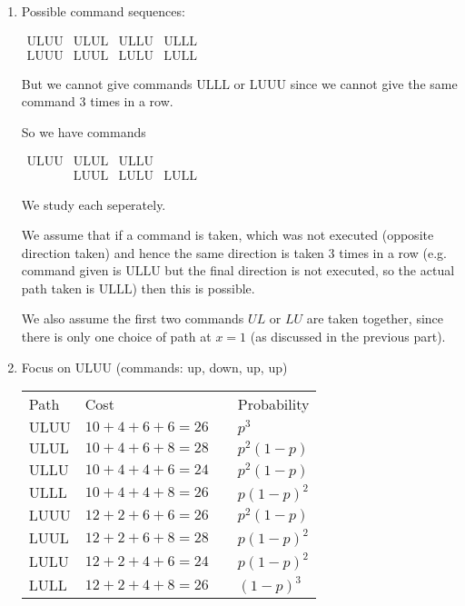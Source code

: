 \begin{prob}
\begin{enumerate}[label = {\textbf{(\greek*)}}]
    \begin{sol}
    \begin{enumerate}[start = 1, label = {\protect\tsc{$\mathbf{S_{\arabic*}}$}}]
\item Possible command sequences:

$\begin{array}{cccc}
    \text{ULUU} & \text{ULUL} & \text{ULLU} & \text{ULLL}  \\
    \text{LUUU} & \text{LUUL} & \text{LULU} & \text{LULL}  
\end{array}$

But we cannot give commands $\text{ULLL}$ or $\text{LUUU}$ since we cannot give the same command 3 times in a row.

So we have commands 

$\begin{array}{cccc}
    \text{ULUU} & \text{ULUL} & \text{ULLU} &   \\
         & \text{LUUL} & \text{LULU} & \text{LULL}  
\end{array}$

We study each seperately.

We assume that if a command is taken, which was not executed (opposite direction taken) and hence the same direction is taken 3 times in a row (e.g. command given is $\text{ULLU}$ but the final direction is not executed, so the actual path taken is $\text{ULLL}$) then this is possible.

We also assume the first two commands $UL$ or $LU$ are taken together, since there is only one choice of path at $x=1$ (as discussed in the previous part).

\item Focus on $\text{ULUU}$ (commands: up, down, up, up)

\begin{tabular}{llcl}
    Path & Cost & \quad & Probability  \\
    $\text{ULUU}$ & $10+4+6+6=26$ & & $p^3$ \\
    $\text{ULUL}$ & $10+4+6+8=28$ & & $p^2(1-p)$ \\
    $\text{ULLU}$ & $10+4+4+6=24$ & & $p^2(1-p)$ \\
    $\text{ULLL}$ & $10+4+4+8=26$ & & $p(1-p)^2$ \\
    $\text{LUUU}$ & $12+2+6+6=26$ & & $p^2(1-p)$ \\
    $\text{LUUL}$ & $12+2+6+8=28$ & & $p(1-p)^2$ \\
    $\text{LULU}$ & $12+2+4+6=24$ & & $p(1-p)^2$ \\
    $\text{LULL}$ & $12+2+4+8=26$ & & $(1-p)^3$ 
\end{tabular}


\end{enumerate}
\end{sol}
\end{enumerate}
\end{prob}
